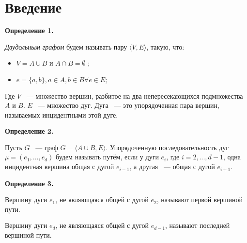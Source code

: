 \documentclass[14pt]{mmcs-article}
\begin{document}
\section*{Введение}

\textbf{Определение 1.}


\textsl{Двудольным графом} будем называть пару $\langle V,E \rangle$, такую, что:

\begin{itemize}
    \item $V = A \cup B$ и $A \cap B = \emptyset$ ;
    \item $e = \{a, b\}, a \in A, b \in B \forall e \in E$;
\end{itemize}

Где $V$ ~--- множество вершин, разбитое на два непересекающихся подмножества $A$ и $B$.
$E$ ~--- множество дуг. Дуга ~--- это упорядоченная пара вершин, называемых инцидентными этой дуге.

\textbf{Определение 2.}






Пусть $G$ ~--- граф $G = \langle A \cup B, E \rangle$.
Упорядоченную последовательность дуг $\mu = (e_1, ..., e_d)$ будем называть путём, если у дуги $e_i$, где $i = 2, ..., d-1$, одна инцидентная вершина общая с дугой $e_{i-1}$, а другая ~--- общая с дугой $e_{i+1}$.

\textbf{Определение 3.}


Вершину дуги $e_1$, не являющаяся общей с дугой $e_2$, называют первой вершиной пути.

Вершину дуги $e_d$, не являющаяся общей с дугой $e_{d-1}$, называют последней вершиной пути.
\end{document}

